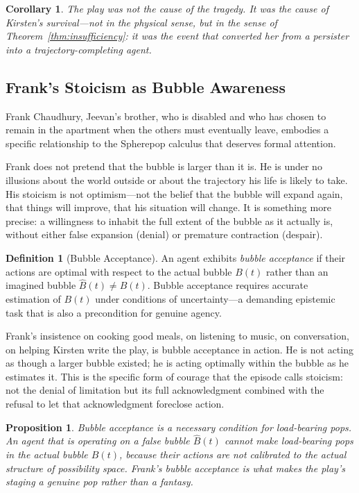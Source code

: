 \documentclass[12pt, oneside]{article}
\theoremstyle{plain}
\newtheorem{proposition}[theorem]{Proposition}
\newtheorem{corollary}[theorem]{Corollary}
\theoremstyle{definition}
\newtheorem{definition}[theorem]{Definition}
\theoremstyle{remark}
\begin{document}
\begin{corollary}
The play was not the cause of the tragedy. It was the cause of
Kirsten's survival---not in the physical sense, but in the
sense of Theorem~\ref{thm:insufficiency}: it was the event that
converted her from a persister into a trajectory-completing agent.
\end{corollary}

\subsection{Frank's Stoicism as Bubble Awareness}

Frank Chaudhury, Jeevan's brother, who is disabled and who has
chosen to remain in the apartment when the others must eventually
leave, embodies a specific relationship to the Spherepop calculus
that deserves formal attention.

Frank does not pretend that the bubble is larger than it is.
He is under no illusions about the world outside or about the
trajectory his life is likely to take. His stoicism is not
optimism---not the belief that the bubble will expand again, that
things will improve, that his situation will change. It is something
more precise: a willingness to inhabit the full extent of the bubble
as it actually is, without either false expansion (denial) or
premature contraction (despair).

\begin{definition}[Bubble Acceptance]
An agent exhibits \emph{bubble acceptance} if their actions are
optimal with respect to the actual bubble $B(t)$ rather than an
imagined bubble $\hat{B}(t) \neq B(t)$. Bubble acceptance requires
accurate estimation of $B(t)$ under conditions of uncertainty---a
demanding epistemic task that is also a precondition for genuine
agency.
\end{definition}

Frank's insistence on cooking good meals, on listening to music,
on conversation, on helping Kirsten write the play, is bubble
acceptance in action. He is not acting as though a larger bubble
existed; he is acting optimally within the bubble as he estimates
it. This is the specific form of courage that the episode calls
stoicism: not the denial of limitation but its full acknowledgment
combined with the refusal to let that acknowledgment foreclose
action.

\begin{proposition}
Bubble acceptance is a necessary condition for load-bearing pops.
An agent that is operating on a false bubble $\hat{B}(t)$ cannot
make load-bearing pops in the actual bubble $B(t)$, because their
actions are not calibrated to the actual structure of possibility
space. Frank's bubble acceptance is what makes the play's staging
a genuine pop rather than a fantasy.
\end{proposition}
\end{document}
